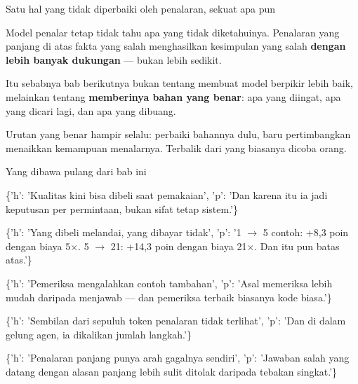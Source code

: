 \documentclass[aspectratio=169,11pt,t]{beamer}
\begin{document}
\begin{frame}[shrink=25]{Satu hal yang tidak diperbaiki oleh penalaran, sekuat apa pun}
{\fontsize{9.4}{12.6}\selectfont\color{fg2}Model penalar tetap tidak tahu apa yang tidak diketahuinya. Penalaran yang panjang di atas fakta yang salah menghasilkan kesimpulan yang salah \textbf{dengan lebih banyak dukungan} --- bukan lebih sedikit.\par}\vskip 4pt
{\fontsize{9.4}{12.6}\selectfont\color{fg2}Itu sebabnya bab berikutnya bukan tentang membuat model berpikir lebih baik, melainkan tentang \textbf{memberinya bahan yang benar}: apa yang diingat, apa yang dicari lagi, dan apa yang dibuang.\par}\vskip 4pt
\begin{iband}[signal]
Urutan yang benar hampir selalu: perbaiki bahannya dulu, baru pertimbangkan menaikkan kemampuan menalarnya. Terbalik dari yang biasanya dicoba orang.
\end{iband}
\end{frame}

\begin{frame}[shrink=25]{Yang dibawa pulang dari bab ini}
\begin{isteps}
\item \{'h': 'Kualitas kini bisa dibeli saat pemakaian', 'p': 'Dan karena itu ia jadi keputusan per permintaan, bukan sifat tetap sistem.'\}
\item \{'h': 'Yang dibeli melandai, yang dibayar tidak', 'p': '1 $\rightarrow$ 5 contoh: +8,3 poin dengan biaya 5$\times$. 5 $\rightarrow$ 21: +14,3 poin dengan biaya 21$\times$. Dan itu pun batas atas.'\}
\item \{'h': 'Pemeriksa mengalahkan contoh tambahan', 'p': 'Asal memeriksa lebih mudah daripada menjawab --- dan pemeriksa terbaik biasanya kode biasa.'\}
\item \{'h': 'Sembilan dari sepuluh token penalaran tidak terlihat', 'p': 'Dan di dalam gelung agen, ia dikalikan jumlah langkah.'\}
\item \{'h': 'Penalaran panjang punya arah gagalnya sendiri', 'p': 'Jawaban salah yang datang dengan alasan panjang lebih sulit ditolak daripada tebakan singkat.'\}
\end{isteps}
\end{frame}
\end{document}
